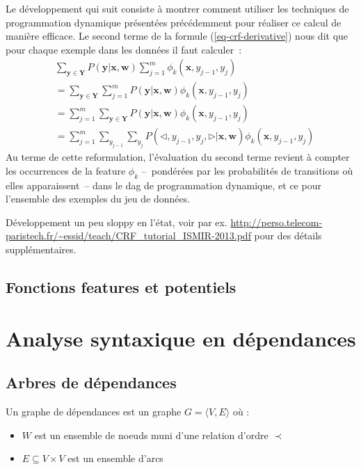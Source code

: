 \documentclass[11pt,openany]{book}
\newcommand{\ac}[1]{{\sc #1}} %
\begin{document}
Le développement qui suit consiste à montrer comment utiliser les techniques de programmation dynamique présentées précédemment pour réaliser ce calcul de manière efficace.  Le second terme de la formule (\ref{eq-crf-derivative}) nous dit que pour chaque exemple dans les données il faut calculer~:
\begin{align}
&\sum_{\mathbf{y}\in \mathbf{Y}} P(\mathbf{y}|\mathbf{x},\mathbf{w}) \sum_{j=1}^m \phi_k(\mathbf{x},y_{j-1},y_j)\\
&=\sum_{\mathbf{y}\in \mathbf{Y}} \sum_{j=1}^m P(\mathbf{y}|\mathbf{x},\mathbf{w})  \phi_k(\mathbf{x},y_{j-1},y_j)\\
&= \sum_{j=1}^m \sum_{\mathbf{y}\in \mathbf{Y}} P(\mathbf{y}|\mathbf{x},\mathbf{w})  \phi_k(\mathbf{x},y_{j-1},y_j)\\
&=  \sum_{j=1}^m \sum_{y_{j-1}}\sum_{y_j} P(\lhd,y_{j-1},y_j,\rhd|\mathbf{x},\mathbf{w})  \phi_k(\mathbf{x},y_{j-1},y_j)
\end{align}
Au terme de cette reformulation, l'évaluation du second terme revient à compter les occurrences de la feature $\phi_k$ --~pondérées par les probabilités de transitions où elles apparaissent~-- dans le \ac{dag} de programmation dynamique, et ce pour l'ensemble des exemples du jeu de données.




{\color{red} Développement un peu sloppy en l'état, voir par ex.
\url{http://perso.telecom-paristech.fr/~essid/teach/CRF_tutorial_ISMIR-2013.pdf}
pour des détails supplémentaires.}


\section{Fonctions features et potentiels}


\chapter{Analyse syntaxique en dépendances}


\section{Arbres de dépendances}

Un graphe de dépendances est un graphe $G = \langle V,E \rangle $
où :
\begin{itemize}
\item $W$ est un ensemble de noeuds muni d'une relation d'ordre $\prec$
\item $E \subseteq V\times V$  est un ensemble d'arcs 
\end{itemize}
\end{document}
